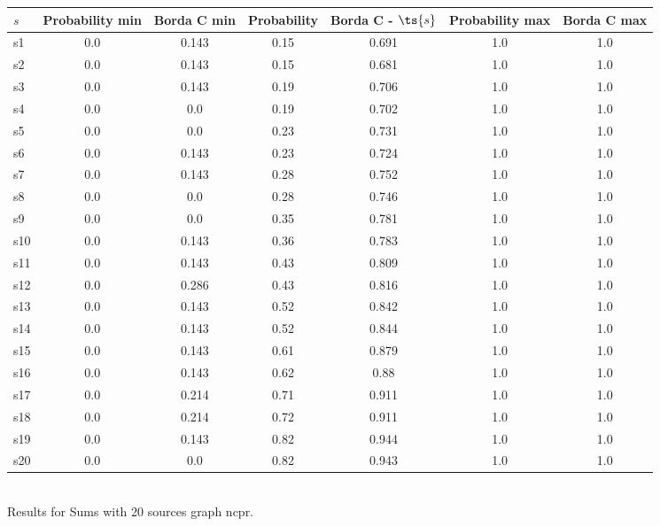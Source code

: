 \documentclass{article}
\begin{document}
\noindent\begin{tabular}{|l|c|c|c|c|c|c|}
\hline
$s$& Probability min & Borda C min & Probability & Borda C - $\ts{s}$ & Probability max & Borda C max\\
\hline
s1 &0.0 & 0.143 & 0.15 & 0.691 & 1.0 & 1.0\\
\hline
s2 &0.0 & 0.143 & 0.15 & 0.681 & 1.0 & 1.0\\
\hline
s3 &0.0 & 0.143 & 0.19 & 0.706 & 1.0 & 1.0\\
\hline
s4 &0.0 & 0.0 & 0.19 & 0.702 & 1.0 & 1.0\\
\hline
s5 &0.0 & 0.0 & 0.23 & 0.731 & 1.0 & 1.0\\
\hline
s6 &0.0 & 0.143 & 0.23 & 0.724 & 1.0 & 1.0\\
\hline
s7 &0.0 & 0.143 & 0.28 & 0.752 & 1.0 & 1.0\\
\hline
s8 &0.0 & 0.0 & 0.28 & 0.746 & 1.0 & 1.0\\
\hline
s9 &0.0 & 0.0 & 0.35 & 0.781 & 1.0 & 1.0\\
\hline
s10 &0.0 & 0.143 & 0.36 & 0.783 & 1.0 & 1.0\\
\hline
s11 &0.0 & 0.143 & 0.43 & 0.809 & 1.0 & 1.0\\
\hline
s12 &0.0 & 0.286 & 0.43 & 0.816 & 1.0 & 1.0\\
\hline
s13 &0.0 & 0.143 & 0.52 & 0.842 & 1.0 & 1.0\\
\hline
s14 &0.0 & 0.143 & 0.52 & 0.844 & 1.0 & 1.0\\
\hline
s15 &0.0 & 0.143 & 0.61 & 0.879 & 1.0 & 1.0\\
\hline
s16 &0.0 & 0.143 & 0.62 & 0.88 & 1.0 & 1.0\\
\hline
s17 &0.0 & 0.214 & 0.71 & 0.911 & 1.0 & 1.0\\
\hline
s18 &0.0 & 0.214 & 0.72 & 0.911 & 1.0 & 1.0\\
\hline
s19 &0.0 & 0.143 & 0.82 & 0.944 & 1.0 & 1.0\\
\hline
s20 &0.0 & 0.0 & 0.82 & 0.943 & 1.0 & 1.0\\
\hline
\end{tabular}\\

\noindent Results for Sums with 20 sources graph ncpr.
\end{document}
